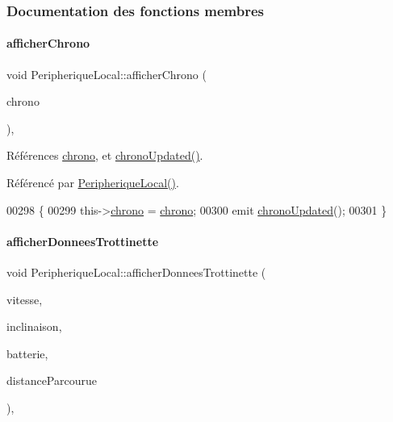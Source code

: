 \subsubsection{Documentation des fonctions membres}
\mbox{\label{class_peripherique_local_af567be15ff8eb2a00cb4e0674ebf3004}} 
\paragraph{\texorpdfstring{afficher\+Chrono}{afficherChrono}}
{\footnotesize\ttfamily void Peripherique\+Local\+::afficher\+Chrono (\begin{DoxyParamCaption}\item[{Q\+String}]{chrono }\end{DoxyParamCaption})\hspace{0.3cm}{\ttfamily [protected]}, {\ttfamily [slot]}}



Références \hyperlink{class_peripherique_local_a8b994159d5d56a45b693b191963d5053}{chrono}, et \hyperlink{class_peripherique_local_a8900d04b38a366bf786d608a741d2dc0}{chrono\+Updated()}.



Référencé par \hyperlink{class_peripherique_local_a99a652b8659a3692f164cf1a0382e4bf}{Peripherique\+Local()}.


\begin{DoxyCode}
00298 \{
00299     this->\hyperlink{class_peripherique_local_a8b994159d5d56a45b693b191963d5053}{chrono} = \hyperlink{class_peripherique_local_a8b994159d5d56a45b693b191963d5053}{chrono};
00300     emit \hyperlink{class_peripherique_local_a8900d04b38a366bf786d608a741d2dc0}{chronoUpdated}();
00301 \}
\end{DoxyCode}
\mbox{\label{class_peripherique_local_a5702930929fea3e197fc1938a2303961}} 
\paragraph{\texorpdfstring{afficher\+Donnees\+Trottinette}{afficherDonneesTrottinette}}
{\footnotesize\ttfamily void Peripherique\+Local\+::afficher\+Donnees\+Trottinette (\begin{DoxyParamCaption}\item[{Q\+String}]{vitesse,  }\item[{Q\+String}]{inclinaison,  }\item[{Q\+String}]{batterie,  }\item[{Q\+String}]{distance\+Parcourue }\end{DoxyParamCaption})\hspace{0.3cm}{\ttfamily [protected]}, {\ttfamily [slot]}}



